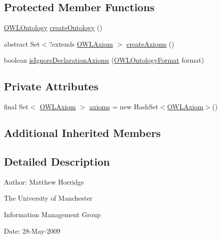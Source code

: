 \subsection*{Protected Member Functions}
\begin{DoxyCompactItemize}
\item 
\hyperlink{interfaceorg_1_1semanticweb_1_1owlapi_1_1model_1_1_o_w_l_ontology}{O\-W\-L\-Ontology} \hyperlink{classorg_1_1semanticweb_1_1owlapi_1_1api_1_1test_1_1baseclasses_1_1_abstract_axioms_round_tripping_test_case_ac7974358b381c28f8d9a296c787cba06}{create\-Ontology} ()
\item 
abstract Set$<$?extends \hyperlink{interfaceorg_1_1semanticweb_1_1owlapi_1_1model_1_1_o_w_l_axiom}{O\-W\-L\-Axiom} $>$ \hyperlink{classorg_1_1semanticweb_1_1owlapi_1_1api_1_1test_1_1baseclasses_1_1_abstract_axioms_round_tripping_test_case_aaf7b870f20b8dbe7756a9cea6db05b6d}{create\-Axioms} ()
\item 
boolean \hyperlink{classorg_1_1semanticweb_1_1owlapi_1_1api_1_1test_1_1baseclasses_1_1_abstract_axioms_round_tripping_test_case_a97f1704711bba03dc0b0919709543d13}{is\-Ignore\-Declaration\-Axioms} (\hyperlink{classorg_1_1semanticweb_1_1owlapi_1_1model_1_1_o_w_l_ontology_format}{O\-W\-L\-Ontology\-Format} format)
\end{DoxyCompactItemize}
\subsection*{Private Attributes}
\begin{DoxyCompactItemize}
\item 
final Set$<$ \hyperlink{interfaceorg_1_1semanticweb_1_1owlapi_1_1model_1_1_o_w_l_axiom}{O\-W\-L\-Axiom} $>$ \hyperlink{classorg_1_1semanticweb_1_1owlapi_1_1api_1_1test_1_1baseclasses_1_1_abstract_axioms_round_tripping_test_case_add68142ec0b0cf9d63a6c12280b7275b}{axioms} = new Hash\-Set$<$\hyperlink{interfaceorg_1_1semanticweb_1_1owlapi_1_1model_1_1_o_w_l_axiom}{O\-W\-L\-Axiom}$>$()
\end{DoxyCompactItemize}
\subsection*{Additional Inherited Members}


\subsection{Detailed Description}
Author\-: Matthew Horridge\par
 The University of Manchester\par
 Information Management Group\par
 Date\-: 28-\/\-May-\/2009 

